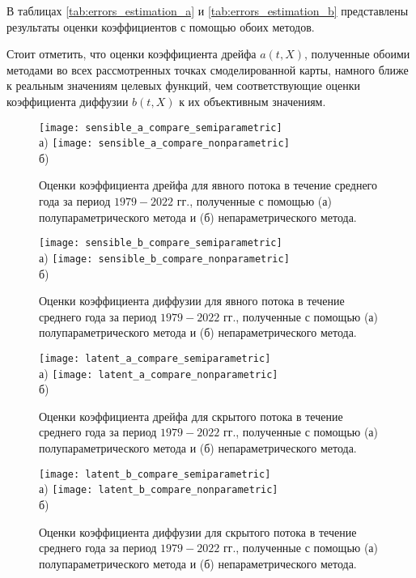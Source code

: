 В таблицах \ref{tab:errors_estimation_a} и \ref{tab:errors_estimation_b} представлены результаты оценки коэффициентов с помощью обоих методов.

Стоит отметить, что оценки коэффициента дрейфа $a(t,X)$, полученные обоими методами во всех рассмотренных точках смоделированной карты, намного ближе к реальным значениям целевых функций, чем соответствующие оценки коэффициента диффузии $b(t,X)$ к их объективным значениям.


\begin{figure}[!h]
	\centering
	\texttt{[image: sensible\_a\_compare\_semiparametric]}\\
	а)
	\texttt{[image: sensible\_a\_compare\_nonparametric]}\\
	б)
	\caption{Оценки коэффициента дрейфа для явного потока в течение среднего года за период $1979-2022$ гг., полученные с помощью (а) полупараметрического метода и (б) непараметрического метода.} 
	\label{fig:sensible_compare_a}
\end{figure}


\begin{figure}[!h]
	\centering
	\texttt{[image: sensible\_b\_compare\_semiparametric]}\\
	а)
	\texttt{[image: sensible\_b\_compare\_nonparametric]}\\
	б)
	\caption{Оценки коэффициента диффузии для явного потока в течение среднего года за период $1979-2022$ гг., полученные с помощью (а) полупараметрического метода и (б) непараметрического метода.} 
	\label{fig:sensible_compare_b}
\end{figure}

\begin{figure}[!h]
	\centering
	\texttt{[image: latent\_a\_compare\_semiparametric]}\\
	а)
	\texttt{[image: latent\_a\_compare\_nonparametric]}\\
	б)
	\caption{Оценки коэффициента дрейфа для скрытого потока в течение среднего года за период $1979-2022$ гг., полученные с помощью (а) полупараметрического метода и (б) непараметрического метода.} 
	\label{fig:latent_compare_a}
\end{figure}


\begin{figure}[!h]
	\centering
	\texttt{[image: latent\_b\_compare\_semiparametric]}\\
	а)
	\texttt{[image: latent\_b\_compare\_nonparametric]}\\
	б)
	\caption{Оценки коэффициента диффузии для скрытого потока в течение среднего года за период $1979-2022$ гг., полученные с помощью (а) полупараметрического метода и (б) непараметрического метода.} 
	\label{fig:latent_compare_b}
\end{figure}

